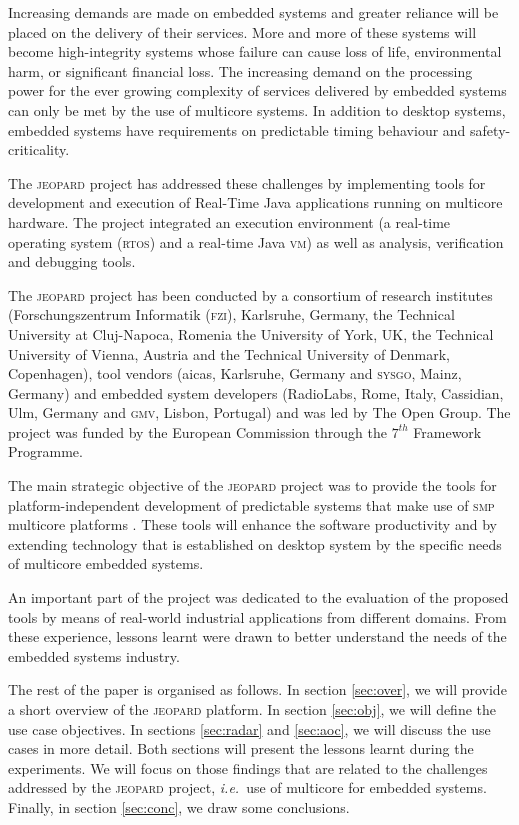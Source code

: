 \documentclass{sig-alternate}
\newcommand{\acronym}[1]{\textsc{#1}}
\newcommand{\ie}{\textit{i.e.}}
\begin{document}
Increasing demands are made on 
embedded systems and greater reliance will be placed on the
delivery of their services. More and more of these systems
will become high-integrity systems whose failure can cause
loss of life, environmental harm, or significant financial loss.
The increasing demand on the processing power for the
ever growing complexity of services delivered by embedded systems
can only be met by the use of multicore systems. In addition to
desktop systems, embedded systems have requirements
on predictable timing behaviour and safety-criticality.

The \acronym{jeopard} project has addressed these challenges
by implementing tools for development and execution 
of Real-Time Java applications running on multicore hardware.
The project integrated an execution environment 
(a real-time operating system (\acronym{rtos}) and
a real-time Java \acronym{vm})
as well as analysis, verification and debugging tools.

The \acronym{jeopard} project has been conducted by a consortium
of research institutes 
(Forschungszentrum Informatik (\acronym{fzi}), 
 Karlsruhe, Germany, 
 the Technical University at Cluj-Napoca, Romenia 
 the University of York, UK,
 the Technical University of Vienna, Austria and
 the Technical University of Denmark, Copenhagen),
tool vendors 
(aicas, Karlsruhe, Germany and
 \acronym{sysgo}, Mainz, Germany)
 and embedded system developers 
(RadioLabs, Rome, Italy, 
 Cassidian, Ulm, Germany and
 \acronym{gmv}, Lisbon, Portugal)
and was led by The Open Group.
The project was funded by the European Commission
through the $7^{th}$ Framework Programme.
 
The main strategic objective of the \acronym{jeopard} project was
to provide the tools for platform-independent development
of predictable systems that make use 
of \acronym{smp} multicore platforms \cite{WhitePaper,sie:09}.
These tools will enhance the software productivity
and   by extending technology that is established
on desktop system by the specific needs of multicore embedded
systems. 

An important part of the project was dedicated to the evaluation
of the proposed tools by means of real-world industrial applications
from different domains.
From these experience, lessons learnt were drawn 
to better understand the needs of the embedded systems industry.

\enlargethispage*{100cm}
The rest of the paper is organised as follows.
In section \ref{sec:over}, we will provide 
a short overview of the \acronym{jeopard} platform.
In section \ref{sec:obj}, we will define
the use case objectives. 
In sections \ref{sec:radar} and \ref{sec:aoc},
we will discuss the use cases in more detail.
Both sections will present the lessons learnt during the experiments.
We will focus on those findings that are related
to the challenges addressed by the \acronym{jeopard} project,
\ie\ use of multicore for embedded systems.
Finally, in section \ref{sec:conc}, we draw some conclusions.
\clearpage
\end{document}
